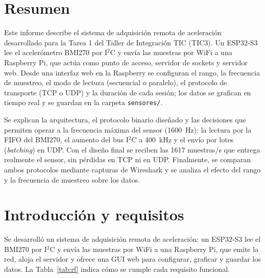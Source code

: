 \documentclass[11pt,a4paper]{report}
\begin{document}
\renewcommand{\lstlistingname}{Código}
\renewcommand{\tablename}{Tabla}
\renewcommand{\listtablename}{Índice de tablas}


\chapter*{Resumen}
Este informe describe el sistema de adquisición remota de aceleración desarrollado para la Tarea 1 del Taller de Integración TIC (TIC3). Un ESP32-S3 lee el acelerómetro BMI270 por I$^2$C y envía las muestras por WiFi a una Raspberry Pi, que actúa como punto de acceso, servidor de sockets y servidor web. Desde una interfaz web en la Raspberry se configuran el rango, la frecuencia de muestreo, el modo de lectura (secuencial o paralelo), el protocolo de transporte (TCP o UDP) y la duración de cada sesión; los datos se grafican en tiempo real y se guardan en la carpeta \texttt{sensores/}.

Se explican la arquitectura, el protocolo binario diseñado y las decisiones que permiten operar a la frecuencia máxima del sensor (1600~Hz): la lectura por la FIFO del BMI270, el aumento del bus I$^2$C a 400~kHz y el envío por lotes (\textit{batching}) en UDP. Con el diseño final se reciben las 1617 muestras/s que entrega realmente el sensor, sin pérdidas en TCP ni en UDP. Finalmente, se comparan ambos protocolos mediante capturas de Wireshark y se analiza el efecto del rango y la frecuencia de muestreo sobre los datos.

\break

\tableofcontents

\clearpage
\setcounter{chapter}{0}

\chapter{Introducción y requisitos}\label{cap:intro}
Se desarrolló un sistema de adquisición remota de aceleración: un ESP32-S3 lee el BMI270 por I$^2$C y envía las muestras por WiFi a una Raspberry Pi, que emite la red, aloja el servidor y ofrece una GUI web para configurar, graficar y guardar los datos. La Tabla~\ref{tab:rf} indica cómo se cumple cada requisito funcional.
\end{document}
